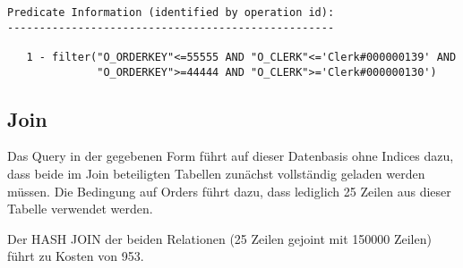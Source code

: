 \documentclass[11pt,a4paper,parskip=half]{scrartcl}
\begin{document}
\begin{lstlisting}
Predicate Information (identified by operation id):                                                                                                                                                                                                                                                          
---------------------------------------------------                                                                                                                                                                                                                                                          
                                                                                                                                                                                                                                                                                                             
   1 - filter("O_ORDERKEY"<=55555 AND "O_CLERK"<='Clerk#000000139' AND                                                                                                                                                                                                                                       
              "O_ORDERKEY">=44444 AND "O_CLERK">='Clerk#000000130') 
\end{lstlisting}

\subsection{Join}
\label{no-idx-join}
Das Query in der gegebenen Form führt auf dieser Datenbasis ohne Indices dazu, dass beide im Join beteiligten Tabellen zunächst vollständig geladen werden müssen. Die Bedingung auf Orders führt dazu, dass lediglich 25 Zeilen aus dieser Tabelle verwendet werden.

Der HASH JOIN der beiden Relationen (25 Zeilen gejoint mit 150000 Zeilen) führt zu Kosten von 953.
\end{document}
